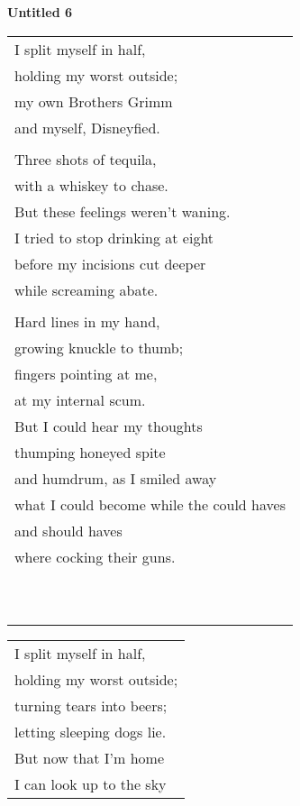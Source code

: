 \documentclass{article}
\begin{document}
\begin{center}
\textbf{Untitled 6} \\
\vspace*{2ex}
\begin{tabular}{l}
I split myself in half, \\
holding my worst outside; \\
my own Brothers Grimm \\
and myself, Disneyfied. \\
\\
Three shots of tequila, \\
with a whiskey to chase. \\
But these feelings weren't waning. \\
I tried to stop drinking at eight \\
before my incisions cut deeper \\
while screaming abate. \\
\\
Hard lines in my hand, \\
growing knuckle to thumb; \\
fingers pointing at me, \\
at my internal scum. \\
But I could hear my thoughts \\
thumping honeyed spite \\
and humdrum, as I smiled away \\
what I could become
while the could haves \\
and should haves \\
where cocking their guns. \\
\\
\\
\\
\\
\\
\\
\\
\\
\\
\\
\end{tabular}
\begin{tabular}{l}
I split myself in half, \\
holding my worst outside; \\
turning tears into beers; \\
letting sleeping dogs lie. \\
But now that I'm home \\
I can look up to the sky \\

\end{tabular}
\end{center}
\end{document}
